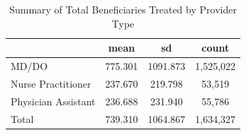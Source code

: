 \begin{table}[htbp]\centering
\def\sym#1{\ifmmode^{#1}\else\(^{#1}\)\fi}
\caption{Summary of Total Beneficiaries Treated by Provider Type}
\begin{tabular}{l*{1}{ccc}}
\toprule
                    &        mean&          sd&       count\\
\midrule
MD/DO               &     775.301&    1091.873&   1,525,022\\
Nurse Practitioner  &     237.670&     219.798&      53,519\\
Physician Assistant &     236.688&     231.940&      55,786\\
Total               &     739.310&    1064.867&   1,634,327\\
\bottomrule
\end{tabular}
\end{table}
